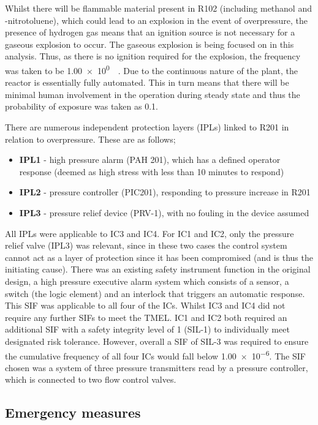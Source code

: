 Whilst there will be flammable material present in R102 (including methanol and \ortho-nitrotoluene), which could lead to an explosion in the event of overpressure, the presence of hydrogen gas means that an ignition source is not necessary for a gaseous explosion to occur. The gaseous explosion is being focused on in this analysis. Thus, as there is no ignition required for the explosion, the frequency was taken to be \SI{1.00e0}{\per\year}. Due to the continuous nature of the plant, the reactor is essentially fully automated. This in turn means that there will be minimal human involvement in the operation during steady state and thus the probability of exposure was taken as 0.1. 

There are numerous  independent protection layers (IPLs) linked to R201 in relation to overpressure. These are as follows;
 
 \begin{itemize}
\item \textbf{IPL1} - high pressure alarm (PAH 201), which has a defined operator response (deemed as high stress with less than 10 minutes to respond)
\item  \textbf{IPL2} - pressure controller (PIC201), responding to pressure increase in R201
\item  \textbf{IPL3} - pressure relief device (PRV-1), with no fouling in the device assumed
 \end{itemize}

All IPLs were applicable to IC3 and IC4. For IC1 and IC2, only the pressure relief valve (IPL3) was relevant, since in these two cases the control system cannot act as a layer of protection since it has been compromised (and is thus the initiating cause). There was an existing safety instrument function in the original design, a high pressure executive alarm system which consists of a sensor, a switch (the logic element) and an interlock that triggers an automatic response. This SIF was applicable to all four of the ICs. Whilst IC3 and IC4 did not require any further SIFs to meet the TMEL. IC1 and IC2 both required an additional SIF with a safety integrity level of 1 (SIL-1) to individually meet designated risk tolerance. However, overall a SIF of SIL-3 was required to ensure the cumulative frequency of all four ICs would fall below \num{1.00e-6}. The SIF chosen was a system of three pressure transmitters read by a pressure controller, which is connected to two flow control valves. 


\subsection{Emergency measures }

